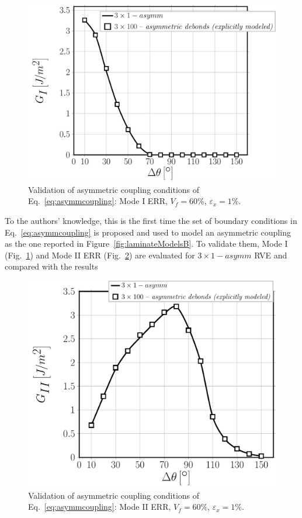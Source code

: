 \documentclass[smallextended]{svjour3}       %
\begin{document}
\begin{figure}[!h]
\centering
\includegraphics[width=\textwidth]{asymm-vs-explmodel-vf60-GI.pdf}
\caption{Validation of asymmetric coupling conditions of Eq.~\ref{eq:asymmcoupling}: Mode I ERR, $V_{f}=60\%$, $\varepsilon_{x}=1\%$.}\label{fig:validationGI}
\end{figure}

To the authors' knowledge, this is the first time the set of boundary conditions in Eq.~\ref{eq:asymmcoupling} is proposed and used to model an asymmetric coupling as the one reported in Figure~\ref{fig:laminateModelsB}. To validate them, Mode I (Fig.~\ref{fig:validationGI}) and Mode II ERR (Fig.~\ref{fig:validationGII}) are evaluated for $3\times 1-asymm$ RVE and compared with the results 

\begin{figure}[!h]
\centering
\includegraphics[width=\textwidth]{asymm-vs-explmodel-vf60-GII.pdf}
\caption{Validation of asymmetric coupling conditions of Eq.~\ref{eq:asymmcoupling}: Mode II ERR, $V_{f}=60\%$, $\varepsilon_{x}=1\%$.}\label{fig:validationGII}
\end{figure}
\end{document}
